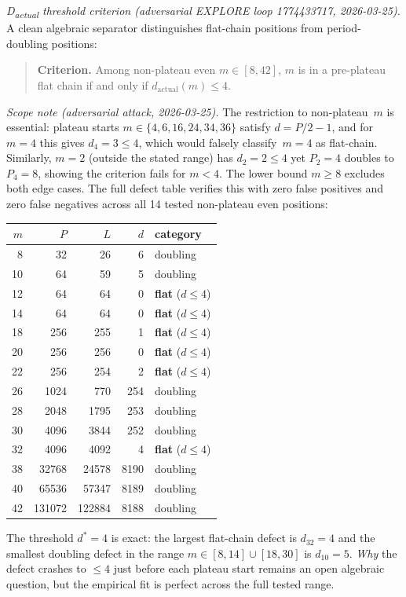 \documentclass[11pt]{article}
\theoremstyle{plain}
\theoremstyle{definition}
\begin{document}
\emph{D\textsubscript{actual} threshold criterion (adversarial EXPLORE loop 1774433717, 2026-03-25).}
A clean algebraic separator distinguishes flat-chain positions from period-doubling positions:
\begin{quote}
\textbf{Criterion.} Among non-plateau even $m \in [8,42]$, $m$ is in a pre-plateau flat chain
if and only if $d_{\mathrm{actual}}(m) \leq 4$.
\end{quote}
\emph{Scope note (adversarial attack, 2026-03-25).} The restriction to non-plateau~$m$ is
essential: plateau starts $m\in\{4,6,16,24,34,36\}$ satisfy $d=P/2-1$, and for $m=4$
this gives $d_4=3\leq 4$, which would falsely classify~$m=4$ as flat-chain.  Similarly,
$m=2$ (outside the stated range) has $d_2=2\leq 4$ yet $P_2=4$ doubles to $P_4=8$, showing
the criterion fails for $m<4$.  The lower bound $m\geq 8$ excludes both edge cases.
The full defect table verifies this with zero false positives and zero false negatives across all
14 tested non-plateau even positions:
\begin{center}
\begin{tabular}{r|r|r|r|l}
$m$ & $P$ & $L$ & $d$ & category \\\hline
8   & 32    & 26     & 6    & doubling \\
10  & 64    & 59     & 5    & doubling \\
12  & 64    & 64     & 0    & \textbf{flat} ($d\!\le\!4$) \\
14  & 64    & 64     & 0    & \textbf{flat} ($d\!\le\!4$) \\
18  & 256   & 255    & 1    & \textbf{flat} ($d\!\le\!4$) \\
20  & 256   & 256    & 0    & \textbf{flat} ($d\!\le\!4$) \\
22  & 256   & 254    & 2    & \textbf{flat} ($d\!\le\!4$) \\
26  & 1024  & 770    & 254  & doubling \\
28  & 2048  & 1795   & 253  & doubling \\
30  & 4096  & 3844   & 252  & doubling \\
32  & 4096  & 4092   & 4    & \textbf{flat} ($d\!\le\!4$) \\
38  & 32768 & 24578  & 8190 & doubling \\
40  & 65536 & 57347  & 8189 & doubling \\
42  & 131072& 122884 & 8188 & doubling \\
\end{tabular}
\end{center}
The threshold $d^*=4$ is exact: the largest flat-chain defect is $d_{32}=4$ and the smallest
doubling defect in the range $m\in[8,14]\cup[18,30]$ is $d_{10}=5$.
\emph{Why} the defect crashes to $\leq 4$ just before each plateau start remains an open
algebraic question, but the empirical fit is perfect across the full tested range.
\end{document}
